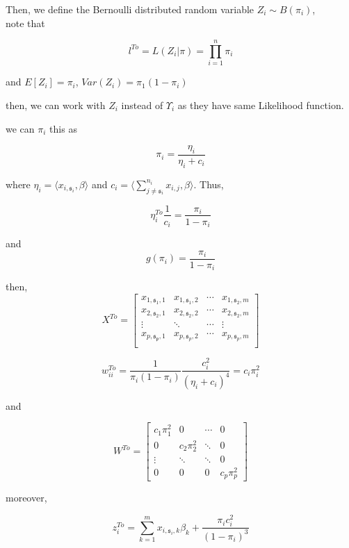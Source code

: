  Then, we define the Bernoulli distributed random variable $Z_i \sim B(\pi_i) $, \\
 
note that 

$$ l^{To}=L(Z_i|\pi) = \displaystyle\prod_{i=1}^n \pi_i $$

and $E[Z_i] = \pi_i$,        $Var(Z_i) = \pi_1(1-\pi_i)$
	
then, we can work with $Z_i$ instead of $\Upsilon_i$ as they have same Likelihood function. 

we can $\pi_i$ this as 

$$ \pi_i = \frac{\eta_i}{\eta_i + c_i} $$ 

where $\eta_i = \langle x_{i,\mathfrak{s}_i},\beta \rangle $ and $c_i = \langle \displaystyle\sum_{j\neq \mathfrak{s}_i}^{n_i} x_{i,j}, \beta \rangle $. Thus, 

$$ \eta_i^{To} \frac{1}{c_i} = \frac{\pi_i}{1-\pi_i} $$ 

and 
 $$g(\pi_i) = \frac{\pi_i}{1-\pi_i} $$ 
	
then, 	
	\[
X^{To}=
  \begin{bmatrix}
 	x_{1,\mathfrak{s_1},1} & x_{1 , \mathfrak{s}_1 , 2} & \cdots & x_{1,\mathfrak{s}_2,m} \\
 	x_{2,\mathfrak{s_2},1} & x_{2,\mathfrak{s}_2,2} & \cdots & x_{2,\mathfrak{s}_2,m} \\
 	\vdots & \ddots & \cdots & \vdots \\
 	x_{p,\mathfrak{s_p},1} & x_{p,\mathfrak{s}_p,2} & \cdots & x_{p,\mathfrak{s}_p,m} \\
  \end{bmatrix}
\]


$$w_{ii}^{To} = \frac{1}{\pi_i(1-\pi_i)}\frac{c_i^2}{(\eta_i+c_i)^4} = c_i\pi_i^2$$

and

\[
W^{To}=
  \begin{bmatrix}
    c_1\pi_1^2     &      0 & \cdots &  0 \\
     0     &    c_2\pi_2^2 & \ddots &  0 \\
    \vdots & \ddots & \ddots  & 0 \\
     0     &      0 & 0 & c_p\pi_p^2
  \end{bmatrix}
\]

moreover, 

$$ z_i^{To} = \displaystyle\sum_{k=1}^m x_{i,\mathfrak{s}_i,k} \beta_k + \frac{\pi_ic_i^2}{(1-\pi_i)^3} $$
	
